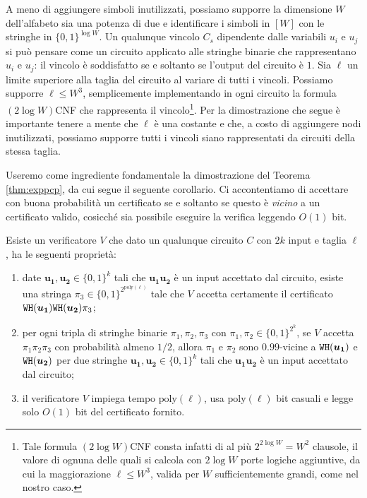 A meno di aggiungere simboli inutilizzati, possiamo supporre la dimensione $W$
dell'alfabeto sia una potenza di due e identificare i simboli in $[W]$ con le
stringhe in $\{0, 1\}^{\log W}$. Un qualunque vincolo $C_s$ dipendente dalle
variabili $u_i$ e $u_j$ si può pensare come un circuito applicato alle stringhe
binarie che rappresentano $u_i$ e $u_j$: il vincolo è soddisfatto se e soltanto
se l'output del circuito è $1$. Sia $\ell$ un limite superiore alla taglia
del circuito al variare di tutti i vincoli. Possiamo supporre $\ell \le W^3$,
semplicemente implementando in ogni circuito la formula $(2 \log W)$CNF che
rappresenta il vincolo\footnote{Tale formula $(2 \log W)$CNF consta infatti di
al più $2^{2 \log W} = W^2$ clausole, il valore di ognuna delle quali si
calcola con $2 \log W$ porte logiche aggiuntive, da cui la maggiorazione
$\ell \le W^3$, valida per $W$ sufficientemente grandi, come nel nostro caso.}.
Per la dimostrazione che segue è importante tenere a mente che
$\ell$ è una costante e che, a costo di aggiungere nodi inutilizzati, possiamo
supporre tutti i vincoli siano rappresentati da circuiti della stessa taglia.

Useremo come ingrediente fondamentale la dimostrazione del Teorema
\ref{thm:exppcp}, da cui segue il seguente corollario.
Ci accontentiamo di accettare con buona probabilità un certificato se e
soltanto se questo è \emph{vicino} a un certificato valido, cosicché sia
possibile eseguire la verifica leggendo $O(1)$ bit.

\begin{corollary} \label{thm:pcpprox}
	Esiste un verificatore $V$ che dato un qualunque circuito $C$ con $2 k$ input
	e taglia $\ell$, ha le seguenti proprietà:
	\begin{enumerate}
		\item date $\bm{u_1}, \bm{u_2} \in \{0, 1\}^k$ tali che $\bm{u_1 u_2}$
			è un input accettato dal circuito, esiste una stringa
			$\pi_3 \in \{0, 1\}^{2^{\mathrm{poly}(\ell)}}$ tale che $V$ accetta
			certamente il certificato $\mathtt{WH}(\bm{u_1}) \mathtt{WH}(\bm{u_2}) \pi_3$;
		\item per ogni tripla di stringhe binarie $\pi_1, \pi_2, \pi_3$ con
			$\pi_1, \pi_2 \in \{0, 1\}^{2^k}$, se $V$ accetta $\pi_1 \pi_2 \pi_3$ con
			probabilità almeno $1/2$, allora $\pi_1$ e $\pi_2$ sono $0.99$-vicine a
			$\mathtt{WH}(\bm{u_1})$ e $\mathtt{WH}(\bm{u_2})$ per due stringhe
			$\bm{u_1}, \bm{u_2} \in \{0, 1\}^k$ tali che $\bm{u_1 u_2}$ è
			un input accettato dal circuito;
		\item il verificatore $V$ impiega tempo $\mathrm{poly}(\ell)$, usa
			$\mathrm{poly}(\ell)$ bit casuali e legge solo $O(1)$ bit del
			certificato fornito.
	\end{enumerate}
\end{corollary}

